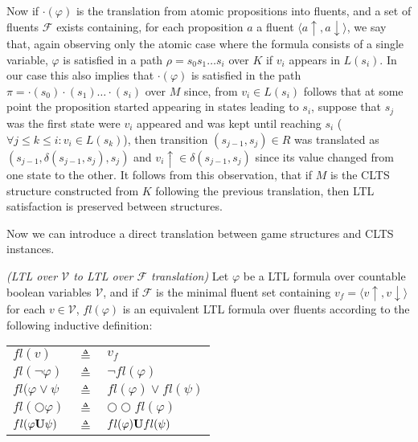 Now if $\cdot(\varphi)$ is the translation from atomic propositions into fluents, and a set of fluents $\mathcal{F}$ exists containing, for each proposition $a$ a fluent $\langle a\uparrow, a\downarrow \rangle$, we say that, again observing only the atomic case where the formula consists of a single variable, $\varphi$ is satisfied in a path $\rho=s_0 s_1\ldots s_i$ over $K$ if $v_i$ appears in $L(s_i)$. In our case this also implies that $\cdot(\varphi)$ is satisfied in the path $\pi=\cdot(s_0)\cdot(s_1)\ldots \cdot(s_i)$ over $M$ since, from $v_i \in L(s_i)$ follows that at some point the proposition started appearing in states leading to $s_i$, suppose that $s_j$ was the first state were $v_i$ appeared and was kept until reaching $s_i$ ($\forall j \leq k \leq i: v_i \in L(s_k)$), then transition $(s_{j-1},s_j) \in R$ was translated as $(s_{j-1}, \delta(s_{j-1},s_j),s_j)$ and $v_i\uparrow \in \delta(s_{j-1},s_j)$ since its value changed from one state to the other. It follows from this observation, that if $M$ is the CLTS structure constructed from $K$ following the previous translation, then LTL satisfaction is preserved between structures.

Now we can introduce a direct translation between game structures and CLTS instances.

\begin{definition}
	\label{def:fl_ltl} \emph{(LTL over $\mathcal{V}$ to LTL over $\mathcal{F}$ translation)} 
	Let $\varphi$ be a LTL formula over countable boolean variables $\mathcal{V}$, and if $\mathcal{F}$ is the minimal fluent set containing $v_f = \langle v\uparrow, v\downarrow \rangle$ for each $v \in \mathcal{V}$, $fl(\varphi)$ is an equivalent LTL formula over fluents according to the following inductive definition:\\
	
\begin{tabular}{ l c l }
	$fl(v)$ & $\triangleq$ & $v_f$\\	
	$fl(\neg \varphi)$ & $\triangleq$ & $\neg fl(\varphi)$\\
	$fl(\varphi \vee \psi$ & $\triangleq$ & $fl(\varphi) \vee fl(\psi)$\\
	$fl(\bigcirc \varphi)$ & $\triangleq$ & $\bigcirc\bigcirc fl(\varphi)$\\
	$fl(\varphi {\bf U} \psi)$ & $\triangleq$ & $fl(\varphi) {\bf U} fl(\psi)$\\
\end{tabular}	
\end{definition}


